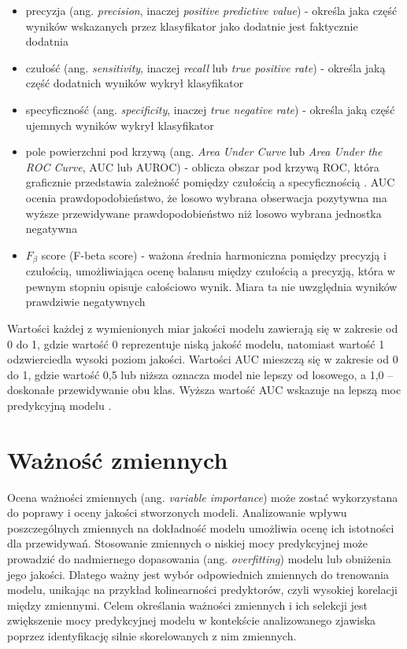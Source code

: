 \documentclass{amuthesis}
\begin{document}
\begin{itemize}
\item
  precyzja (ang. \emph{precision}, inaczej \emph{positive predictive
  value}) - określa jaka część wyników wskazanych przez klasyfikator
  jako dodatnie jest faktycznie dodatnia
  \autocite{jaworski_2013_perfomance_measures}
\item
  czułość (ang. \emph{sensitivity}, inaczej \emph{recall} lub \emph{true
  positive rate}) - określa jaką część dodatnich wyników wykrył
  klasyfikator \autocite{jaworski_2013_perfomance_measures}
\item
  specyficzność (ang. \emph{specificity}, inaczej \emph{true negative
  rate}) - określa jaką część ujemnych wyników wykrył klasyfikator
  \autocite{jaworski_2013_perfomance_measures}
\item
  pole powierzchni pod krzywą (ang. \emph{Area Under Curve} lub
  \emph{Area Under the ROC Curve}, AUC lub AUROC) - oblicza obszar pod
  krzywą ROC, która graficznie przedstawia zależność pomiędzy czułością
  a specyficznością \autocite{jaworski_2013_perfomance_measures}. AUC
  ocenia prawdopodobieństwo, że losowo wybrana obserwacja pozytywna ma
  wyższe przewidywane prawdopodobieństwo niż losowo wybrana jednostka
  negatywna \autocite{R-mlr3measures}
\item
  \(F_{\beta}\) score (F-beta score) - ważona średnia harmoniczna
  pomiędzy precyzją i czułością, umożliwiająca ocenę balansu między
  czułością a precyzją, która w pewnym stopniu opisuje całościowo wynik.
  Miara ta nie uwzględnia wyników prawdziwie negatywnych
  \autocite{zygierewicz_2021_ml}
\end{itemize}

Wartości każdej z wymienionych miar jakości modelu zawierają się w
zakresie od 0 do 1, gdzie wartość 0 reprezentuje niską jakość modelu,
natomiast wartość 1 odzwierciedla wysoki poziom jakości. Wartości AUC
mieszczą się w zakresie od 0 do 1, gdzie wartość 0,5 lub niższa oznacza
model nie lepszy od losowego, a 1,0 -- doskonałe przewidywanie obu klas.
Wyższa wartość AUC wskazuje na lepszą moc predykcyjną modelu
\autocite{lovelace_2019_geocomputation}.

\hypertarget{sec-variable-importance}{%
\section{Ważność zmiennych}\label{sec-variable-importance}}

Ocena ważności zmiennych (ang. \emph{variable importance}) może zostać
wykorzystana do poprawy i oceny jakości stworzonych modeli. Analizowanie
wpływu poszczególnych zmiennych na dokładność modelu umożliwia ocenę ich
istotności dla przewidywań. Stosowanie zmiennych o niskiej mocy
predykcyjnej może prowadzić do nadmiernego dopasowania (ang.
\emph{overfitting}) modelu lub obniżenia jego jakości. Dlatego ważny
jest wybór odpowiednich zmiennych do trenowania modelu, unikając na
przykład kolinearności predyktorów, czyli wysokiej korelacji między
zmiennymi. Celem określania ważności zmiennych i ich selekcji jest
zwiększenie mocy predykcyjnej modelu w kontekście analizowanego zjawiska
poprzez identyfikację silnie skorelowanych z nim zmiennych.
\end{document}
